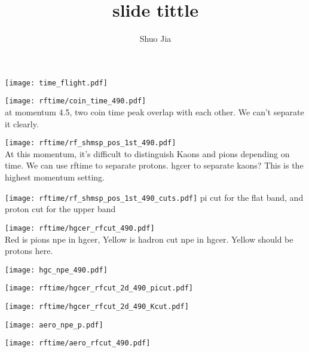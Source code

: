 \documentclass[aspectratio=169,xcolor=dvipsnames]{beamer}
\title{slide tittle}
\date{}
\author{Shuo Jia}
\begin{document}
\maketitle
\begin{frame}
  \texttt{[image: time\_flight.pdf]}
\end{frame}
\begin{frame}
  \texttt{[image: rftime/coin\_time\_490.pdf]}
\\
at momentum 4.5, two coin time peak overlap with each other. We can't separate it clearly.
\end{frame}
\begin{frame}
  \texttt{[image: rftime/rf\_shmsp\_pos\_1st\_490.pdf]}
\\
At this momentum, it's difficult to distinguish Kaons and pions depending on time. We can use rftime to separate protons. hgcer to separate kaons? This is the highest momentum setting. 
\end{frame}
\begin{frame}
  \texttt{[image: rftime/rf\_shmsp\_pos\_1st\_490\_cuts.pdf]}
pi cut for the flat band, and proton cut for the upper band
\end{frame}
\begin{frame}
  \texttt{[image: rftime/hgcer\_rfcut\_490.pdf]}
  \\
  Red is pions npe in hgcer, Yellow is hadron cut npe in hgcer. Yellow should be protons here. 
\end{frame}
\begin{frame}
  \texttt{[image: hgc\_npe\_490.pdf]}
\end{frame}
\begin{frame}
  \texttt{[image: rftime/hgcer\_rfcut\_2d\_490\_picut.pdf]}
  \\
\end{frame}
\begin{frame}
  \texttt{[image: rftime/hgcer\_rfcut\_2d\_490\_Kcut.pdf]}
\end{frame}
\begin{frame}
  \texttt{[image: aero\_npe\_p.pdf]}
\end{frame}
\begin{frame}
  \texttt{[image: rftime/aero\_rfcut\_490.pdf]}
\end{frame}
\end{document}

